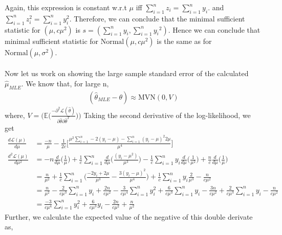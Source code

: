 \documentclass[11pt]{article}
\begin{document}
{Again, this expression is constant w.r.t $\mu$ iff $\sum_{i=1}^{n}z_i = \sum_{i=1}^ny_i$. and $\sum_{i=1}^{n}z_i^2 = \sum_{i=1}^ny_i^2$. Therefore, we can conclude that the minimal sufficient statistic for $(\mu, c\mu^2)$ is $s = (\sum_{i=1}^ny_i, \sum_{i=1}^n{y_i}^2)$. Hence we can conclude that minimal sufficient statistic for $\text{Normal}(\mu, c \mu^2)$ is the same as for $\text{Normal}(\mu, \sigma^2)$.\\ \\
Now let us work on showing the large sample standard error of the calculated $\hat{\mu}_{MLE}$. We know that, for large n,
\begin{equation}
  \nonumber
  \begin{aligned}
    (\hat{\theta}_{MLE} - \theta) \approx \text{MVN}(0,V)
  \end{aligned}
\end{equation}
where, $V = \bigg(\mathbb{E}\bigg(\frac{-\partial^2\mathcal{L}(\hat{\theta})}{\partial \hat{\theta}\partial \hat{\theta}^T}\bigg)\bigg)$ Taking the second derivative of the log-likelihood, we get
\begin{equation}
  \nonumber
  \begin{aligned}
    \frac{d \mathcal{L}(\mu)}{d \mu} & = \frac{-n}{\mu} - \frac{1}{2c}\bigg[\frac{\mu^{2}\sum_{i = 1}^{n}-2(y_{i} - \mu) - \sum_{i = 1}^{n} (y_{i} - \mu)^{2}2 \mu}{\mu^{4}}\bigg]\\
    \frac{d^2 \mathcal{L}(\mu)}{d \mu^2} & = -n\frac{d}{d \mu}\bigg(\frac{1}{\mu}\bigg) + \frac{1}{c}\sum_{i=1}^{n}\frac{d}{d \mu}\bigg(\frac{(y_i-\mu^2)}{\mu^3}\bigg) - \frac{1}{c}\sum_{i=1}^{n}y_i\frac{d}{d \mu}\bigg(\frac{1}{\mu^2}\bigg) + \frac{n}{c}\frac{d}{d \mu}\bigg(\frac{1}{\mu}\bigg)\\
    & = \frac{n}{\mu^2} + \frac{1}{c}\sum_{i=1}^n\bigg(\frac{-2y_i+2\mu}{\mu^3}-\frac{3(y_i-\mu)^2}{\mu^4}\bigg) + \frac{1}{c}\sum_{i=1}^ny_i\frac{2}{\mu^3} -\frac{n}{c\mu^2}\\
    & = \frac{n}{\mu^2} - \frac{2}{c\mu^3}\sum_{i=1}^{n}y_{i} + \frac{2n}{c\mu^2} - \frac{3}{c\mu^4}\sum_{i=1}^{n}y_{i}^2 + \frac{6}{c\mu^3}\sum_{i=1}^{n}y_i - \frac{3n}{c\mu^2} + \frac{2}{c\mu^3}\sum_{i=1}^{n}y_i - \frac{n}{c\mu^2}\\
    & = \frac{-3}{c\mu^4}\sum_{i=1}^ny_i^2 + \frac{6}{c\mu^3}y_i - \frac{2n}{c\mu^2} + \frac{n}{\mu^2}
  \end{aligned}
\end{equation}
Further, we calculate the expected value of the negative of this double derivate as,
\begin{equation}

\end{equation}}
\end{document}
